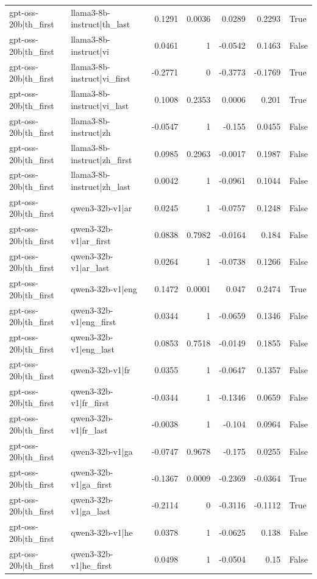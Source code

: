 \begin{table}
\begin{tabular}{l l r r r r l}
gpt-oss-20b|th_first & llama3-8b-instruct|th_last & 0.1291 & 0.0036 & 0.0289 & 0.2293 & True \\
gpt-oss-20b|th_first & llama3-8b-instruct|vi & 0.0461 & 1 & -0.0542 & 0.1463 & False \\
gpt-oss-20b|th_first & llama3-8b-instruct|vi_first & -0.2771 & 0 & -0.3773 & -0.1769 & True \\
gpt-oss-20b|th_first & llama3-8b-instruct|vi_last & 0.1008 & 0.2353 & 0.0006 & 0.201 & True \\
gpt-oss-20b|th_first & llama3-8b-instruct|zh & -0.0547 & 1 & -0.155 & 0.0455 & False \\
gpt-oss-20b|th_first & llama3-8b-instruct|zh_first & 0.0985 & 0.2963 & -0.0017 & 0.1987 & False \\
gpt-oss-20b|th_first & llama3-8b-instruct|zh_last & 0.0042 & 1 & -0.0961 & 0.1044 & False \\
gpt-oss-20b|th_first & qwen3-32b-v1|ar & 0.0245 & 1 & -0.0757 & 0.1248 & False \\
gpt-oss-20b|th_first & qwen3-32b-v1|ar_first & 0.0838 & 0.7982 & -0.0164 & 0.184 & False \\
gpt-oss-20b|th_first & qwen3-32b-v1|ar_last & 0.0264 & 1 & -0.0738 & 0.1266 & False \\
gpt-oss-20b|th_first & qwen3-32b-v1|eng & 0.1472 & 0.0001 & 0.047 & 0.2474 & True \\
gpt-oss-20b|th_first & qwen3-32b-v1|eng_first & 0.0344 & 1 & -0.0659 & 0.1346 & False \\
gpt-oss-20b|th_first & qwen3-32b-v1|eng_last & 0.0853 & 0.7518 & -0.0149 & 0.1855 & False \\
gpt-oss-20b|th_first & qwen3-32b-v1|fr & 0.0355 & 1 & -0.0647 & 0.1357 & False \\
gpt-oss-20b|th_first & qwen3-32b-v1|fr_first & -0.0344 & 1 & -0.1346 & 0.0659 & False \\
gpt-oss-20b|th_first & qwen3-32b-v1|fr_last & -0.0038 & 1 & -0.104 & 0.0964 & False \\
gpt-oss-20b|th_first & qwen3-32b-v1|ga & -0.0747 & 0.9678 & -0.175 & 0.0255 & False \\
gpt-oss-20b|th_first & qwen3-32b-v1|ga_first & -0.1367 & 0.0009 & -0.2369 & -0.0364 & True \\
gpt-oss-20b|th_first & qwen3-32b-v1|ga_last & -0.2114 & 0 & -0.3116 & -0.1112 & True \\
gpt-oss-20b|th_first & qwen3-32b-v1|he & 0.0378 & 1 & -0.0625 & 0.138 & False \\
gpt-oss-20b|th_first & qwen3-32b-v1|he_first & 0.0498 & 1 & -0.0504 & 0.15 & False \\

\end{tabular}
\end{table}
